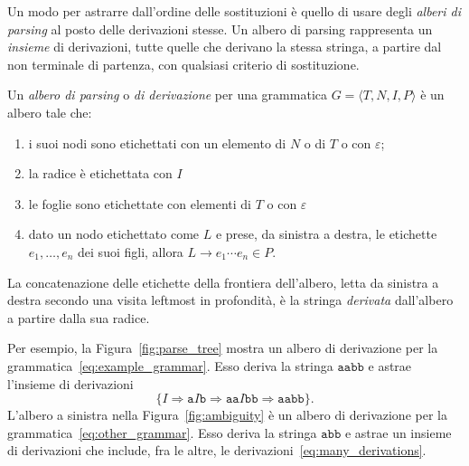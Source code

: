 Un modo per astrarre dall'ordine delle sostituzioni \`e quello di usare
degli \emph{alberi di parsing} al posto delle derivazioni stesse. Un albero
di parsing rappresenta un \emph{insieme} di derivazioni, tutte quelle
che derivano la stessa stringa, a partire dal non terminale
di partenza, con qualsiasi criterio di sostituzione.
%
\begin{definition}\label{def:parsing_tree}
Un \emph{albero di parsing} o \emph{di derivazione}
per una grammatica $G=\langle T,N,I,P\rangle$ \`e un albero tale che:
\begin{enumerate}
\item i suoi nodi sono etichettati con un elemento di $N$ o di $T$ o con
      $\varepsilon$;
\item la radice \`e etichettata con $I$
\item le foglie sono etichettate con elementi di $T$ o con $\varepsilon$
\item dato un nodo etichettato come $L$ e prese, da sinistra a destra,
      le etichette $e_1,\ldots,e_n$ dei suoi figli, allora
      $L\to e_1\cdots e_n\in P$.
\end{enumerate}
La concatenazione delle etichette della
frontiera dell'albero, letta da sinistra a destra secondo una visita
leftmost in profondit\`a, \`e la stringa
\emph{derivata} dall'albero a partire dalla sua radice.
\end{definition}
%
\noindent
Per esempio, la Figura~\ref{fig:parse_tree} mostra un albero di derivazione
per la grammatica~\eqref{eq:example_grammar}. Esso deriva la stringa
$\mathtt{aabb}$ e astrae l'insieme di derivazioni
\[
  \{I\Rightarrow\mathtt{a}I\mathtt{b}\Rightarrow\mathtt{aa}I\mathtt{bb}
    \Rightarrow\mathtt{aabb}\}.
\]
%
L'albero a sinistra nella Figura~\ref{fig:ambiguity} \`e un albero di
derivazione per la grammatica~\eqref{eq:other_grammar}. Esso deriva la stringa
$\mathtt{abb}$ e astrae un insieme di derivazioni che include, fra
le altre, le derivazioni~\eqref{eq:many_derivations}.

